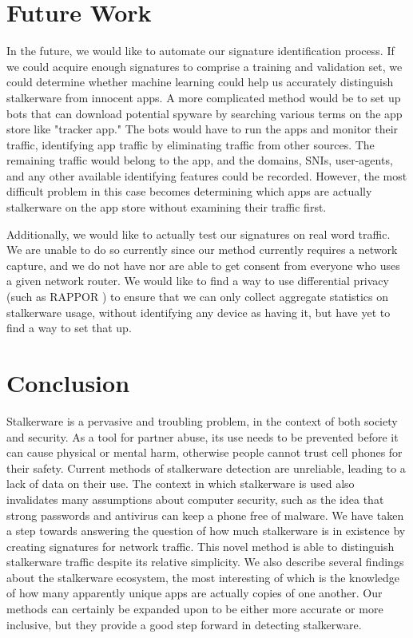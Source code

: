 \documentclass[acmtog]{acmart}
\begin{document}
\section{Future Work}

In the future, we would like to automate our signature identification process. 
If we could acquire enough signatures to comprise a training and validation 
set, we could determine whether machine learning could help us accurately 
distinguish stalkerware from innocent apps. A more complicated method 
would be to set up bots that can download potential spyware by searching 
various terms on the app store like "tracker app." The bots would have to run 
the apps and monitor their traffic, identifying app traffic by eliminating 
traffic from other sources. The remaining traffic would belong to the app, and 
the domains, SNIs, user-agents, and any other available identifying features 
could be recorded. However, the most difficult problem in this case becomes 
determining which apps are actually stalkerware on the app store without 
examining their traffic first.

Additionally, we would like to actually test our signatures on real word 
traffic. We are unable to do so currently since our method currently requires a 
network capture, and we do not have nor are able to get consent from everyone 
who uses a given network router. We would like to find a way to use 
differential privacy (such as RAPPOR \cite{erlingsson_rappor:_2014}) to ensure 
that we can only collect aggregate statistics on 
stalkerware usage, without identifying any device as having it, but have yet to 
find a way to set that up.

\section{Conclusion}

Stalkerware is a pervasive and troubling problem, in the context of both 
society and security. As a tool for partner abuse, its use needs to be 
prevented before it can cause physical or mental harm, otherwise people cannot 
trust cell phones for their safety. Current methods of stalkerware detection 
are unreliable, leading to a lack of data on their use. The context in which 
stalkerware is used also invalidates many assumptions about computer security, 
such as the idea that strong passwords and antivirus can keep a phone free of 
malware. We have taken a step towards answering the question of how much 
stalkerware is in existence by creating signatures for network traffic. This 
novel method is able to distinguish stalkerware traffic despite 
its relative simplicity. We also describe several findings about the 
stalkerware ecosystem, the most interesting of which is the knowledge of how 
many apparently unique apps are actually copies of one another. Our methods 
can certainly be expanded upon to be either more accurate or more 
inclusive, but they provide a good step forward in detecting stalkerware.
\end{document}
